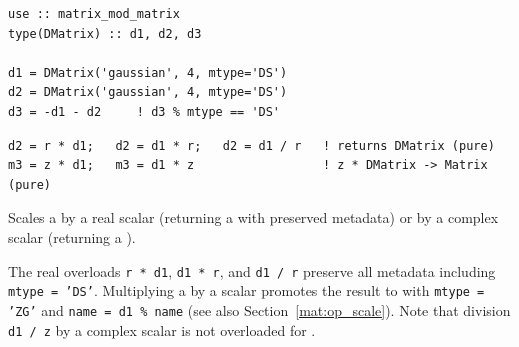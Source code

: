 \begin{description}[leftmargin=2.2cm, style=nextline]
\end{description}

\lstset{language=[95]Fortran}
\begin{lstlisting}
use :: matrix_mod_matrix
type(DMatrix) :: d1, d2, d3

d1 = DMatrix('gaussian', 4, mtype='DS')
d2 = DMatrix('gaussian', 4, mtype='DS')
d3 = -d1 - d2     ! d3 % mtype == 'DS'
\end{lstlisting}


\lstset{language=[95]Fortran}
\begin{lstlisting}
d2 = r * d1;   d2 = d1 * r;   d2 = d1 / r   ! returns DMatrix (pure)
m3 = z * d1;   m3 = d1 * z                  ! z * DMatrix -> Matrix (pure)
\end{lstlisting}

Scales a  by a real scalar (returning a  with preserved metadata) or by a complex scalar (returning a ).

The real overloads \texttt{r * d1}, \texttt{d1 * r}, and \texttt{d1 / r} preserve all metadata including \texttt{mtype = 'DS'}. Multiplying a  by a  scalar  promotes the result to  with \texttt{mtype = 'ZG'} and \texttt{name = d1 \% name} (see also Section~\ref{mat:op_scale}). Note that division \texttt{d1 / z} by a complex scalar is not overloaded for .

\begin{description}[leftmargin=2.2cm, style=nextline]
\end{description}


